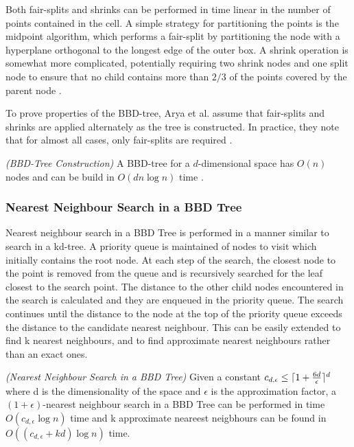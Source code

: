 \documentclass[mcs]{scsthesis}
\begin{document}
Both fair-splits and shrinks can be performed in time linear in the number of
points contained in the cell. A simple strategy for partitioning the points is
the midpoint algorithm, which performs a fair-split by partitioning the node
with a hyperplane orthogonal to the longest edge of the outer box. A shrink
operation is somewhat more complicated, potentially requiring two shrink nodes
and one split node to ensure that no child contains more than \(2/3\) of the
points covered by the parent node \cite{optimalann}.

To prove properties of the BBD-tree, Arya et al. assume that fair-splits and
shrinks are applied alternately as the tree is constructed. In practice, they
note that for almost all cases, only fair-splits are required \cite{optimalann}. 

\begin{thm} \emph{(BBD-Tree Construction)} 
A BBD-tree for a \(d\)-dimensional space has \(O(n)\) nodes and can be build in
\(O(d n \log n)\) time \cite{optimalann}.
\end{thm}

\subsubsection{Nearest Neighbour Search in a BBD Tree}

Nearest neighbour search in a BBD Tree is performed in a manner similar to
search in a kd-tree. A priority queue is maintained of nodes to visit which
initially contains the root node. At each step of the search, the closest
node to the point is removed from the queue and is recursively searched for
the leaf closest to the search point. The distance to the other child nodes
encountered in the search is calculated and they are enqueued in the priority
queue. The search continues until the distance to the node at the top of the
priority queue exceeds the distance to the candidate nearest neighbour. This
can be easily extended to find k nearest neighbours, and to find approximate
nearest neighbours rather than an exact ones.

\begin{thm} \emph{(Nearest Neighbour Search in a BBD Tree)} 
Given a constant \(c_{d,\epsilon} \le \lceil 1 + {6d \over \epsilon} \rceil^d\)
where d is the dimensionality of the space and \(\epsilon\) is the approximation
factor, a \((1 + \epsilon)\)-nearest neighbour search in a BBD Tree can be
performed in time \(O(c_{d,\epsilon} \log n)\) time and k approximate neareest
neigbhours can be found in \(O((c_{d,\epsilon} + kd) \log n)\) time.
\end{thm}
\end{document}
